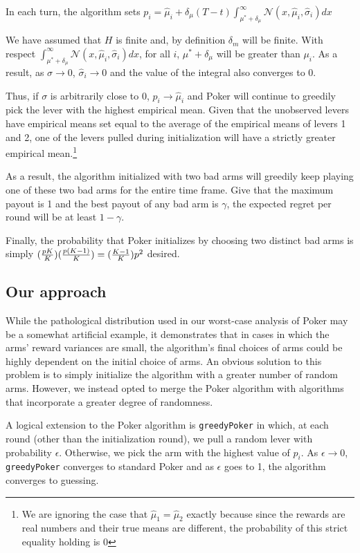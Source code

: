 \documentclass[12pt]{article}
\begin{document}
In each turn, the algorithm sets $p_{i} = \hat{\mu}_{i} + \delta_{\mu}(T-t)\int_{\mu^{*}+\delta_{\mu}}^{\infty}\mathcal{N}(x,\hat{\mu}_{i}, \hat{\sigma}_{i})dx$

We have assumed that $H$ is finite and, by definition $\delta_{m}$ will be finite. With respect $\int_{\mu^{*}+\delta_{\mu}}^{\infty}\mathcal{N}(x,\hat{\mu}_{i}, \hat{\sigma}_{i})dx$, for all $i$, $\mu^{*}+\delta_{\mu}$ will be greater than $\mu_{i}$. As a result, as $\sigma \to 0$, $\hat{\sigma}_{i} \to 0$ and the value of the integral also converges to 0.

Thus, if $\sigma$ is arbitrarily close to $0$, $p_{i} \rightarrow \hat{\mu}_{i}$ and Poker will continue to greedily pick the lever with the highest empirical mean. Given that the unobserved levers have empirical means set equal to the average of the empirical means of levers 1 and 2, one of the levers pulled during initialization will have a strictly greater empirical mean.\footnote{We are ignoring the case that $\hat{\mu}_{1} = \hat{\mu}_{2}$ exactly because since the rewards are real numbers and their true means are different, the probability of this strict equality holding is 0}

As a result, the algorithm initialized with two bad arms will greedily keep playing one of these two bad arms for the entire time frame. Give that the maximum payout is 1 and the best payout of any bad arm is $\gamma$, the expected regret per round will be at least $1-\gamma$. 

Finally, the probability that Poker initializes by choosing two distinct bad arms is simply $({pK\over{K}})({p(K-1)\over{K}}) = ({K-1\over K})p^{2}$ desired.

\subsection{Our approach}

While the pathological distribution used in our worst-case analysis of Poker may be a somewhat artificial example, it demonstrates that in cases in which the arms' reward variances are small, the algorithm's final choices of arms could be highly dependent  on the initial choice of arms. An obvious solution to this problem is to simply initialize the algorithm with a greater number of random arms. However, we instead opted to merge the Poker algorithm with algorithms that incorporate a greater degree of randomness.

A logical extension to the Poker algorithm is \texttt{greedyPoker} in which, at each round (other than the initialization round), we pull a random lever with probability $\epsilon$. Otherwise, we pick the arm with the highest value of $p_{i}$. As $\epsilon \to 0$, \texttt{greedyPoker} converges to standard Poker and as $\epsilon$ goes to 1, the algorithm converges to guessing.
\end{document}
